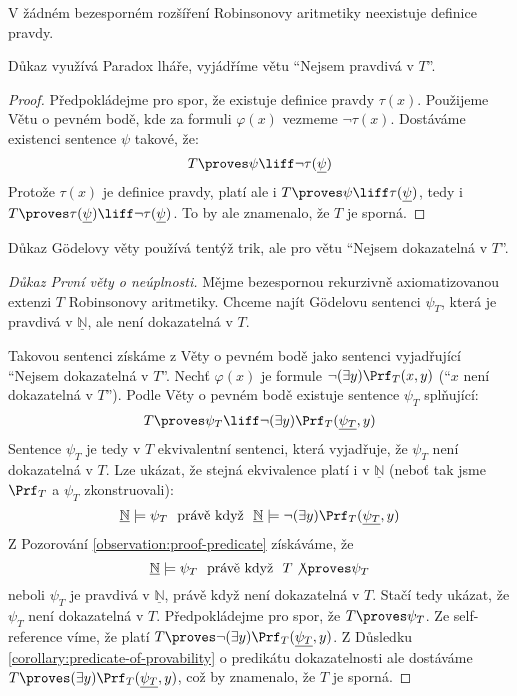 \begin{theorem}
    V žádném bezesporném rozšíření Robinsonovy aritmetiky neexistuje definice pravdy.
\end{theorem}
Důkaz využívá \alert{Paradox lháře}, vyjádříme větu ``Nejsem pravdivá v $T$''.
\begin{proof}
Předpokládejme pro spor, že existuje definice pravdy $\tau(x)$.
Použijeme Větu o pevném bodě, kde za formuli $\varphi(x)$ vezmeme $\neg\tau(x)$. Dostáváme existenci sentence $\psi$ takové, že:
$$
T\proves\psi\liff\neg\tau(\underline{\psi})
$$
Protože $\tau(x)$ je definice pravdy, platí ale i $T\proves\psi\liff\tau(\underline{\psi})$, tedy i $T\proves\tau(\underline{\psi})\liff\neg\tau(\underline{\psi})$. To by ale znamenalo, že $T$ je sporná.
\end{proof}

Důkaz Gödelovy věty používá tentýž trik, ale pro větu ``Nejsem dokazatelná v $T$''.

\begin{proof}[Důkaz První věty o neúplnosti]
Mějme bezespornou rekurzivně axiomatizovanou extenzi $T$ Robinsonovy aritmetiky. Chceme najít Gödelovu sentenci $\psi_T$, která je pravdivá v $\underline{\mathbb N}$, ale není dokazatelná v $T$.

Takovou sentenci získáme z Věty o pevném bodě jako sentenci vyjadřující ``Nejsem dokazatelná v $T$''. Nechť $\varphi(x)$ je formule $\neg(\exists y)\Prf_T(x,y)$ (``$x$ není dokazatelná v $T$''). Podle Věty o pevném bodě existuje sentence $\psi_T$ splňující:
$$
T\proves\psi_T\liff\neg(\exists y)\Prf_T(\underline{\psi_T},y)
$$
Sentence $\psi_T$ je tedy v $T$ ekvivalentní sentenci, která vyjadřuje, že $\psi_T$ není dokazatelná v $T$. Lze ukázat, že stejná ekvivalence platí i v $\underline{\mathbb N}$ (neboť tak jsme $\Prf_T$ a $\psi_T$ zkonstruovali):
$$
\underline{\mathbb N}\models\psi_T\ \text{ právě když }\ \underline{\mathbb N}\models\neg(\exists y)\Prf_T(\underline{\psi_T},y)
$$
Z Pozorování \ref{observation:proof-predicate} získáváme, že 
$$
\underline{\mathbb N}\models\psi_T\ \text{ právě když }\ T\not\proves\psi_T
$$
neboli $\psi_T$ je pravdivá v $\underline{\mathbb N}$, právě když není dokazatelná v $T$. Stačí tedy ukázat, že $\psi_T$ není dokazatelná v $T$. Předpokládejme pro spor, že $T\proves\psi_T$. Ze self-reference víme, že platí
$T\proves\neg(\exists y)\Prf_T(\underline{\psi_T},y)$.
Z Důsledku \ref{corollary:predicate-of-provability} o predikátu dokazatelnosti ale dostáváme $T\proves (\exists y)\Prf_T(\underline{\psi_T},y)$, což by znamenalo, že $T$ je sporná.
\end{proof}


